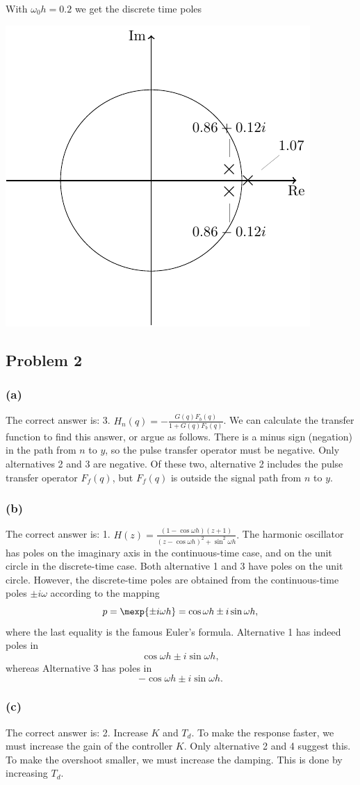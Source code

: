 \documentclass{scrartcl}
\begin{document}
With \(\omega_0h=0.2\) we get the discrete time poles
\begin{center}
\includegraphics[width=0.3\linewidth]{imaginary-plane-dt-poles}
\end{center}

\subsection*{Problem 2}
\label{sec:orgheadline13}

\subsubsection*{(a)}
\label{sec:orgheadline10}
The correct answer is: 3. \(H_n(q) = -\frac{G(q)F_b(q)}{1 + G(q)F_b(q)}\). We can calculate the transfer function to find this answer, or argue as follows. There is a minus sign (negation) in the path from \(n\) to \(y\), so the pulse transfer operator must be negative. Only alternatives 2 and 3 are negative. Of these two, alternative 2 includes the pulse transfer operator \(F_f(q)\), but \(F_f(q)\) is outside the signal path from \(n\) to \(y\).

\subsubsection*{(b)}
\label{sec:orgheadline11}
The correct answer is: 1. \(H(z) = \frac{(1-\cos\omega h)(z+1)}{(z-\cos \omega h)^2 + \sin^2 \omega h}.\)
The harmonic oscillator has poles on the imaginary axis in the continuous-time case, and on the unit circle in the discrete-time case. Both alternative 1 and 3 have poles on the unit circle. However, the discrete-time poles are obtained from the continuous-time poles \(\pm i\omega\) according to the mapping
\[ p = \mexp{\pm i\omega h} = \cos\omega h \pm i\sin\omega h, \]
where the last equality is the famous Euler's formula. Alternative 1 has indeed poles in 
\[ \cos\omega h \pm i \sin\omega h, \]
whereas Alternative 3 has poles in 
\[ -\cos\omega h \pm i \sin\omega h. \]

\subsubsection*{(c)}
\label{sec:orgheadline12}
The correct answer is:  2. Increase \(K\) and \(T_d\). To make the response faster, we must increase the gain of the controller \(K\). Only alternative 2 and 4 suggest this. To make the overshoot smaller, we must increase the damping. This is done by increasing \(T_d\). 
\end{document}
